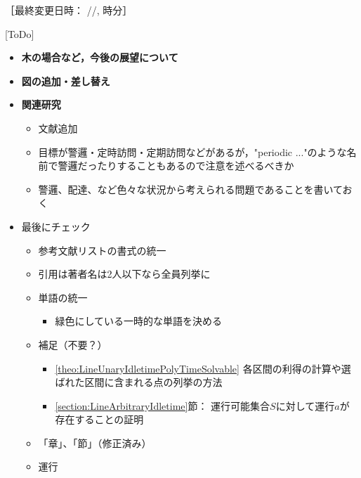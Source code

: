 ［最終変更日時：
{\the\year/\the\month/\the\day, {\the\hour} 時{\the\minute}分}］

 [ToDo]
\begin{itemize}
  \item \textbf{木の場合など，今後の展望について}
  \item \textbf{図の追加・差し替え}
  \item \textbf{関連研究}
  \begin{itemize}
    \item 文献追加
    \item 目標が警邏・定時訪問・定期訪問などがあるが，"periodic ..."のような名前で警邏だったりすることもあるので注意を述べるべきか
    \item 警邏、配達、など色々な状況から考えられる問題であることを書いておく
  \end{itemize}
  \item 最後にチェック
  \begin{itemize}
    \item 参考文献リストの書式の統一
    \item 引用は著者名は2人以下なら全員列挙に
    \item 単語の統一
    \begin{itemize}
      \item 緑色にしている一時的な単語を決める
    \end{itemize}
    \item 補足（不要？）
    \begin{itemize}
      \item \ref{theo:LineUnaryIdletimePolyTimeSolvable}
        各区間の利得の計算や選ばれた区間に含まれる点の列挙の方法
      \item \ref{section:LineArbitraryIdletime}節：
        運行可能集合$S$に対して運行$a$が存在することの証明
    \end{itemize}
    \item 「章」、「節」（修正済み）
    \item 運行
  \end{itemize}
\end{itemize}
